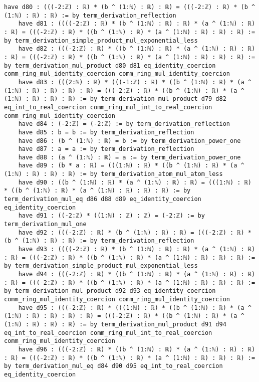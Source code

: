 \documentclass{article}
\begin{document}
\begin{tcolorbox}[colback=white!10, width=\linewidth]
\begin{lstlisting}[language=Lean4]
    have d80 : (((-2:ℤ) : ℝ) * (b ^ (1:ℕ) : ℝ) : ℝ) = (((-2:ℤ) : ℝ) * (b ^ (1:ℕ) : ℝ) : ℝ) := by term_derivation_reflection
    have d81 : ((((-2:ℤ) : ℝ) * (b ^ (1:ℕ) : ℝ) : ℝ) * (a ^ (1:ℕ) : ℝ) : ℝ) = (((-2:ℤ) : ℝ) * ((b ^ (1:ℕ) : ℝ) * (a ^ (1:ℕ) : ℝ) : ℝ) : ℝ) := by term_derivation_simple_product_mul_exponential_less
    have d82 : (((-2:ℤ) : ℝ) * ((b ^ (1:ℕ) : ℝ) * (a ^ (1:ℕ) : ℝ) : ℝ) : ℝ) = (((-2:ℤ) : ℝ) * ((b ^ (1:ℕ) : ℝ) * (a ^ (1:ℕ) : ℝ) : ℝ) : ℝ) := by term_derivation_mul_product d80 d81 eq_identity_coercion comm_ring_mul_identity_coercion comm_ring_mul_identity_coercion
    have d83 : (((2:ℕ) : ℝ) * (((-1:ℤ) : ℝ) * ((b ^ (1:ℕ) : ℝ) * (a ^ (1:ℕ) : ℝ) : ℝ) : ℝ) : ℝ) = (((-2:ℤ) : ℝ) * ((b ^ (1:ℕ) : ℝ) * (a ^ (1:ℕ) : ℝ) : ℝ) : ℝ) := by term_derivation_mul_product d79 d82 eq_int_to_real_coercion comm_ring_mul_int_to_real_coercion comm_ring_mul_identity_coercion
    have d84 : (-2:ℤ) = (-2:ℤ) := by term_derivation_reflection
    have d85 : b = b := by term_derivation_reflection
    have d86 : (b ^ (1:ℕ) : ℝ) = b := by term_derivation_power_one
    have d87 : a = a := by term_derivation_reflection
    have d88 : (a ^ (1:ℕ) : ℝ) = a := by term_derivation_power_one
    have d89 : (b * a : ℝ) = (((1:ℕ) : ℝ) * ((b ^ (1:ℕ) : ℝ) * (a ^ (1:ℕ) : ℝ) : ℝ) : ℝ) := by term_derivation_atom_mul_atom_less
    have d90 : ((b ^ (1:ℕ) : ℝ) * (a ^ (1:ℕ) : ℝ) : ℝ) = (((1:ℕ) : ℝ) * ((b ^ (1:ℕ) : ℝ) * (a ^ (1:ℕ) : ℝ) : ℝ) : ℝ) := by term_derivation_mul_eq d86 d88 d89 eq_identity_coercion eq_identity_coercion
    have d91 : ((-2:ℤ) * ((1:ℕ) : ℤ) : ℤ) = (-2:ℤ) := by term_derivation_mul_one
    have d92 : (((-2:ℤ) : ℝ) * (b ^ (1:ℕ) : ℝ) : ℝ) = (((-2:ℤ) : ℝ) * (b ^ (1:ℕ) : ℝ) : ℝ) := by term_derivation_reflection
    have d93 : ((((-2:ℤ) : ℝ) * (b ^ (1:ℕ) : ℝ) : ℝ) * (a ^ (1:ℕ) : ℝ) : ℝ) = (((-2:ℤ) : ℝ) * ((b ^ (1:ℕ) : ℝ) * (a ^ (1:ℕ) : ℝ) : ℝ) : ℝ) := by term_derivation_simple_product_mul_exponential_less
    have d94 : (((-2:ℤ) : ℝ) * ((b ^ (1:ℕ) : ℝ) * (a ^ (1:ℕ) : ℝ) : ℝ) : ℝ) = (((-2:ℤ) : ℝ) * ((b ^ (1:ℕ) : ℝ) * (a ^ (1:ℕ) : ℝ) : ℝ) : ℝ) := by term_derivation_mul_product d92 d93 eq_identity_coercion comm_ring_mul_identity_coercion comm_ring_mul_identity_coercion
    have d95 : (((-2:ℤ) : ℝ) * (((1:ℕ) : ℝ) * ((b ^ (1:ℕ) : ℝ) * (a ^ (1:ℕ) : ℝ) : ℝ) : ℝ) : ℝ) = (((-2:ℤ) : ℝ) * ((b ^ (1:ℕ) : ℝ) * (a ^ (1:ℕ) : ℝ) : ℝ) : ℝ) := by term_derivation_mul_product d91 d94 eq_int_to_real_coercion comm_ring_mul_int_to_real_coercion comm_ring_mul_identity_coercion
    have d96 : (((-2:ℤ) : ℝ) * ((b ^ (1:ℕ) : ℝ) * (a ^ (1:ℕ) : ℝ) : ℝ) : ℝ) = (((-2:ℤ) : ℝ) * ((b ^ (1:ℕ) : ℝ) * (a ^ (1:ℕ) : ℝ) : ℝ) : ℝ) := by term_derivation_mul_eq d84 d90 d95 eq_int_to_real_coercion eq_identity_coercion

\end{lstlisting}
\end{tcolorbox}
\end{document}
